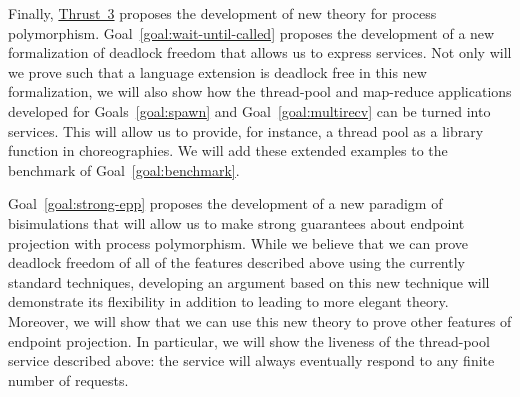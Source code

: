 Finally, \hyperref[sec:t3]{Thrust~3} proposes the development of new theory for process polymorphism.
Goal~\ref{goal:wait-until-called} proposes the development of a new formalization of deadlock freedom that allows us to express services.
Not only will we prove such that a language extension is deadlock free in this new formalization, we will also show how the thread-pool and map-reduce applications developed for Goals~\ref{goal:spawn} and Goal~\ref{goal:multirecv} can be turned into services.
This will allow us to provide, for instance, a thread pool as a library function in choreographies.
We will add these extended examples to the benchmark of Goal~\ref{goal:benchmark}.

Goal~\ref{goal:strong-epp} proposes the development of a new paradigm of bisimulations that will allow us to make strong guarantees about endpoint projection with process polymorphism.
While we believe that we can prove deadlock freedom of all of the features described above using the currently standard techniques, developing an argument based on this new technique will demonstrate its flexibility in addition to leading to more elegant theory.
Moreover, we will show that we can use this new theory to prove other features of endpoint projection.
In particular, we will show the liveness of the thread-pool service described above: the service will always eventually respond to any finite number of requests.

